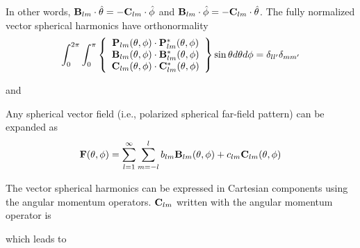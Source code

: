 In other words, $\mathbf{B}_{lm}\cdot \hat{\theta} = -\mathbf{C}_{lm} \cdot\hat{\phi} $ and  $\mathbf{B}_{lm}\cdot \hat{\phi} = -\mathbf{C}_{lm} \cdot\hat{\theta} $.  The fully normalized vector spherical harmonics have orthonormality 
\begin{equation}
\int_0^{2\pi} \int_0^{\pi}
\left\{
\begin{array}{c}
\mathbf{P}_{lm}(\theta,\phi) \cdot \mathbf{P}^*_{lm}(\theta,\phi) \\
\mathbf{B}_{lm}(\theta,\phi) \cdot \mathbf{B}^*_{lm}(\theta,\phi) \\
\mathbf{C}_{lm}(\theta,\phi) \cdot \mathbf{C}^*_{lm}(\theta,\phi) 
\end{array}
\right\}
\sin\theta d\theta d\phi = \delta_{ll'}\delta_{mm'}
\end{equation}

and

Any spherical vector field (i.e., polarized spherical far-field pattern) can be expanded as
\begin{equation}
\mathbf{F}(\theta,\phi) = \sum_{l=1}^{\infty}\sum_{m=-l}^l b_{lm} \mathbf{B}_{lm}(\theta,\phi) + c_{lm}\mathbf{C}_{lm}(\theta,\phi) \label{FinBC}
\end{equation}

The vector spherical harmonics can be expressed in Cartesian components using the angular momentum operators.  $\mathbf{C}_{lm}$ written with the angular momentum operator is 

which leads to 

